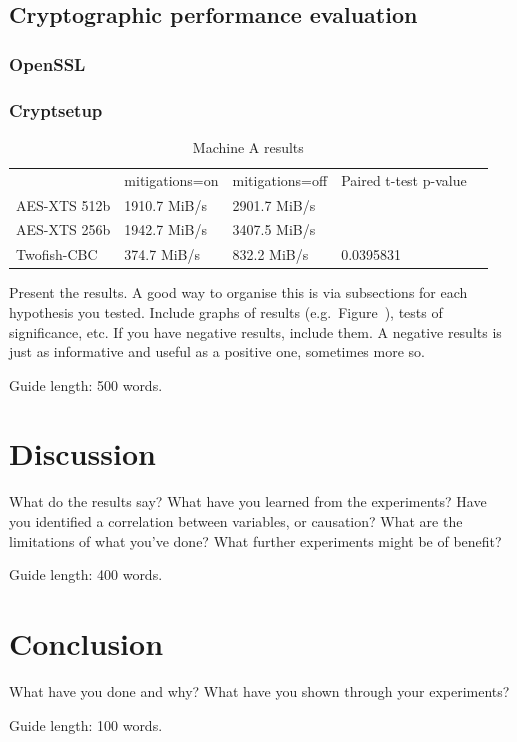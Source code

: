 \documentclass{csfourzero}
\begin{document}
\subsection{Cryptographic performance evaluation}

\subsubsection{OpenSSL}

\subsubsection{Cryptsetup}
\begin{table}[h]
\centering
\begin{tabular}{|l|l|l|l|l}
\cline{1-4}
             & mitigations=on & mitigations=off & Paired t-test p-value &  \\ \cline{1-4}
AES-XTS 512b & 1910.7 MiB/s   & 2901.7 MiB/s    &         &  \\ \cline{1-4}
AES-XTS 256b & 1942.7 MiB/s   & 3407.5 MiB/s    &         &  \\ \cline{1-4}
Twofish-CBC  & 374.7 MiB/s    & 832.2 MiB/s     & 0.0395831 &  \\ \cline{1-4}
\end{tabular}
\caption{Machine A results }
\label{tab:cryptoa}
\end{table}

Present the results. A good way to organise this is via subsections
for each hypothesis you tested. Include graphs of results
(e.g.\ Figure~), tests of significance, etc. If you have
negative results, include them. A negative results is just as
informative and useful as a positive one, sometimes more so.


Guide length: 500 words.

\section{Discussion}
\label{sec:discuss}

What do the results say? What have you learned from the
experiments? Have you identified a correlation between variables, or
causation? What are the limitations of what you've done? What further
experiments might be of benefit?

Guide length: 400 words.

\section{Conclusion}
\label{sec:conc}

What have you done and why? What have you shown through your
experiments?

Guide length: 100 words.


\end{document}
